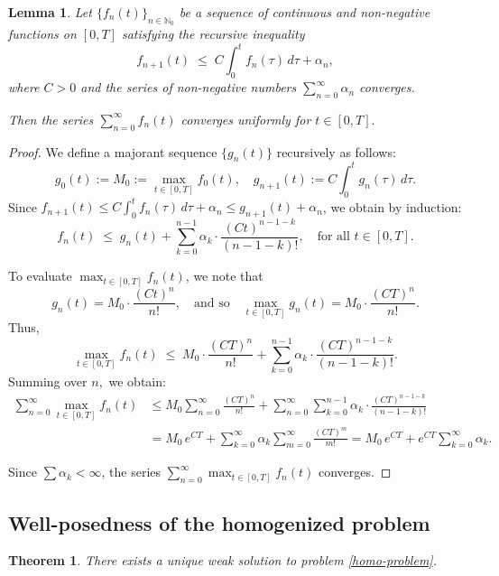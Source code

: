 \documentclass[reqno]{amsart}            %
\newtheorem{theorem}{Theorem}[section]
\newtheorem{lemma}{Lemma}[section]
\numberwithin{equation}{section}
\begin{document}
	\begin{lemma}\label{lemma-4-3}
		Let $\{f_n(t)\}_{n\in \mathbb{N}_0}$ be a sequence of continuous and non-negative functions on $[0,T]$
		satisfying the recursive inequality
		\[
		f_{n+1}(t) \;\le\; C \int_0^t f_n(\tau)\, d\tau + \alpha_n,
		\]
		where $C > 0$ and the series of non-negative numbers $\sum_{n=0}^{\infty} \alpha_n$ converges.
		
		Then the series $\sum_{n=0}^{\infty} f_n(t) $
		converges uniformly for $t\in[0,T].$ 
	\end{lemma}
	\begin{proof} We define a majorant sequence $\{g_n(t)\}$ recursively as follows:
		\[
		g_0(t) := M_0 := \max_{t \in [0, T]} f_0(t), \quad
		g_{n+1}(t) := C \int_0^t g_n(\tau)\, d\tau.
		\]
		Since \( f_{n+1}(t) \le C \int_0^t f_n(\tau)\,d\tau + \alpha_n \le g_{n+1}(t) + \alpha_n \),
		we obtain by induction:
		\[
		f_n(t) \;\le\; g_n(t) + \sum_{k=0}^{n-1} \alpha_k \cdot \frac{(C t)^{n-1-k}}{(n-1-k)!},
		\quad \text{for all } t \in [0, T].
		\]
		
		
		To evaluate \( \max_{t \in [0,T]} f_n(t) \), we note that 
		\[
		g_n(t) = M_0 \cdot \frac{(C t)^n}{n!},
		\quad \text{and so} \quad \max_{t \in [0,T]} g_n(t) = M_0 \cdot \frac{(C T)^n}{n!}.
		\]
		Thus,	
		\[
		\max_{t \in [0,T]} f_n(t)
		\;\le\; M_0 \cdot \frac{(C T)^n}{n!}
		+ \sum_{k=0}^{n-1} \alpha_k \cdot \frac{(C T)^{n-1-k}}{(n-1-k)!}.
		\]
		Summing over $n,$ we obtain:
		\begin{align*}
			\sum_{n=0}^{\infty} \max_{t \in [0,T]} f_n(t)
			&\le M_0 \sum_{n=0}^{\infty} \frac{(C T)^n}{n!}
			+ \sum_{n=0}^{\infty} \sum_{k=0}^{n-1} \alpha_k \cdot \frac{(C T)^{n-1-k}}{(n-1-k)!} \\
			&= M_0\, e^{C T} + \sum_{k=0}^{\infty} \alpha_k \sum_{m=0}^{\infty} \frac{(C T)^m}{m!}
			= M_0\, e^{C T} + e^{C T} \sum_{k=0}^{\infty} \alpha_k.
		\end{align*}
		
		Since \( \sum \alpha_k < \infty \), the series \( \sum_{n=0}^{\infty} \max_{t \in [0,T]} f_n(t) \) converges.
	\end{proof}
	
	
	\subsection{Well-posedness of the homogenized problem}\label{par-exist}
	\begin{theorem}\label{Th-4-1}
		There exists a unique weak solution to problem \eqref{homo-problem}. 
	\end{theorem}
	
\end{document}
